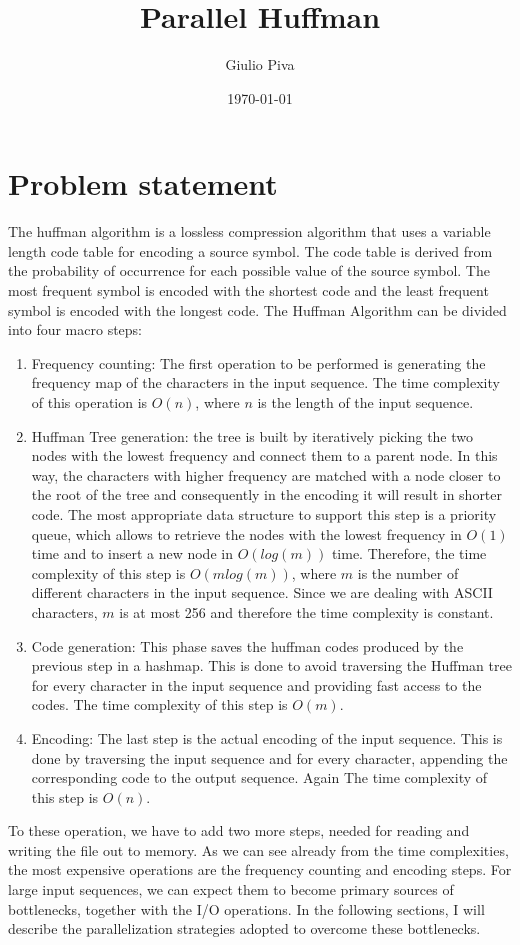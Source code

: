 \documentclass{article}
\title{Parallel Huffman}
\author{Giulio Piva}
\date{\today}
\begin{document}
\maketitle

\tableofcontents
\break
\section{Problem statement}
The huffman algorithm is a lossless compression algorithm that uses a variable length code table
for encoding a source symbol. The code table is derived from the probability of occurrence for each
possible value of the source symbol. The most frequent symbol is encoded with the shortest code
and the least frequent symbol is encoded with the longest code.
The Huffman Algorithm can be divided into four macro steps:
\begin{enumerate}
    \item Frequency counting: The first operation to be performed is generating the frequency map of the characters in the input sequence.
    The time complexity of this operation is $O(n)$, where $n$ is the length of the input sequence.
    \item Huffman Tree generation: the tree is built by iteratively picking the two nodes with the lowest frequency and connect them to a parent node.
    In this way, the characters with higher frequency are matched with a node closer to the root of the tree and consequently
    in the encoding it will result in shorter code. The most appropriate data structure to
    support this step is a priority queue, which allows to retrieve the nodes with the lowest frequency in $O(1)$ time and to insert a new node in $O(log(m))$ time.
    Therefore, the time complexity of this step is $O(mlog(m))$, where $m$ is the number of different characters in the input sequence. Since
    we are dealing with ASCII characters, $m$ is at most 256 and therefore the time complexity is constant.
    \item Code generation: This phase saves the huffman codes produced by the previous step in a hashmap. This
    is done to avoid traversing the Huffman tree for every character in the input sequence and providing fast access to the codes.
    The time complexity of this step is $O(m)$.
    \item Encoding: The last step is the actual encoding of the input sequence. This is done by traversing the input sequence and
    for every character, appending the corresponding code to the output sequence. Again The time complexity of this step is $O(n)$.
\end{enumerate}
To these operation, we have to add two more steps, needed for reading and writing the file out to memory.
As we can see already from the time complexities, the most expensive operations are the frequency counting and encoding steps.
For large input sequences, we can expect them to become primary sources of bottlenecks, together with the I/O operations.
In the following sections, I will describe the parallelization strategies adopted to overcome these bottlenecks.
\end{document}
